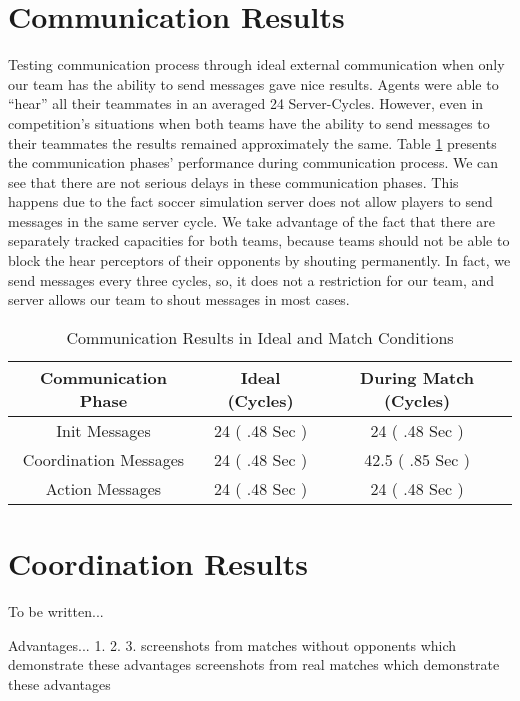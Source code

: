 \section{Communication Results}
Testing communication process through ideal external communication when only our team has the ability to send messages gave nice results. Agents were able to ``hear'' all their teammates in an averaged 24 Server-Cycles. However, even in competition's situations when both teams have the ability to send messages to their teammates the results remained approximately the same. Table \ref{CommunicationResults} presents the communication phases' performance during communication process. We can see that there are not serious delays in these communication phases. This happens due to the fact soccer simulation server does not allow players to send messages in the same server cycle. We take advantage of the fact that there are separately tracked capacities for both teams, because teams should not be able to block the hear perceptors of their opponents by shouting permanently. In fact, we send  messages every three cycles, so, it does not a restriction for our team, and server allows our team to shout messages in most cases.

\begin{table}
\begin{center}
    \begin{tabular}{ | c | c | c |}
    \hline
    \textbf{Communication Phase} 	& Ideal (Cycles) 			& During Match (Cycles) \\ \hline
    Init Messages 					& 24  ( .48 Sec ) 			& 24 	( .48 Sec )		 \\ \hline	
    Coordination Messages			& 24  ( .48 Sec )			& 42.5  ( .85 Sec )			 \\ \hline
    Action Messages 				& 24  ( .48 Sec )			& 24 ( .48 Sec )	 		 \\ 
    \hline
    \end{tabular}
\end{center}
\label{CommunicationResults}
\caption{Communication Results in Ideal and Match Conditions}
\end{table}

\section{Coordination Results}
To be written...

Advantages...
1.
2.
3.
screenshots from matches without opponents which demonstrate these advantages
screenshots from real matches which demonstrate these advantages

